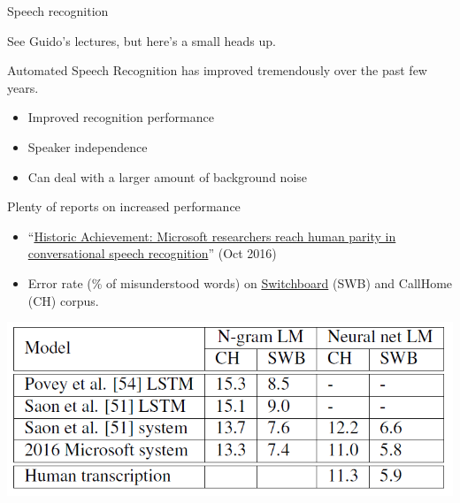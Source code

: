\documentclass[compress]{beamer}
\begin{document}
\begin{frame}{Speech recognition}

    See Guido's lectures, but here's a small heads up.

    Automated Speech Recognition has improved tremendously over the past few
    years.

    \begin{itemize}
        \item Improved recognition performance
        \item Speaker independence
        \item Can deal with a larger amount of background noise
    \end{itemize}

    Plenty of reports on increased performance

\begin{itemize}

\item ``\href{https://blogs.microsoft.com/next/2016/10/18/historic-achievement-microsoft-researchers-reach-human-parity-conversational-speech-recognition/\#g5qKXHrZZ2pbxuPH.99}{Historic
  Achievement: Microsoft researchers reach human parity in
  conversational speech recognition}'' (Oct 2016)
\item Error rate (\% of misunderstood words) on
  \href{https://catalog.ldc.upenn.edu/LDC2004S13}{Switchboard} (SWB) and
  CallHome (CH) corpus.
\end{itemize}

    \begin{center}
        \includegraphics[width=0.8\linewidth]{asr-error-rates}
    \end{center}

\end{frame}
\end{document}
